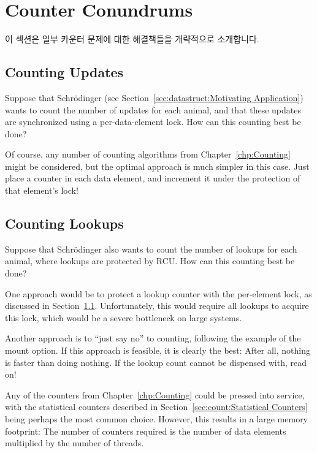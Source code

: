 
\section{Counter Conundrums}
\label{sec:together:Counter Conundrums}

이 섹션은 일부 카운터 문제에 대한 해결책들을 개략적으로 소개합니다.
\iffalse

This section outlines possible solutions to some counter conundrums.
\fi

\subsection{Counting Updates}
\label{sec:together:Counting Updates}

Suppose that Schr\"odinger (see
Section~\ref{sec:datastruct:Motivating Application})
wants to count the number of updates for each animal,
and that these updates are synchronized using a per-data-element lock.
How can this counting best be done?

Of course, any number of counting algorithms from
Chapter~\ref{chp:Counting}
might be considered, but the optimal approach is much simpler in this case.
Just place a counter in each data element, and increment it under the
protection of that element's lock!

\subsection{Counting Lookups}
\label{sec:together:Counting Lookups}

Suppose that Schr\"odinger also wants to count the number of lookups for
each animal, where lookups are protected by RCU.
How can this counting best be done?

One approach would be to protect a lookup counter with the per-element
lock, as discussed in
Section~\ref{sec:together:Counting Updates}.
Unfortunately, this would require all lookups to acquire this lock,
which would be a severe bottleneck on large systems.

Another approach is to ``just say no'' to counting, following the example
of the  mount option.
If this approach is feasible, it is clearly the best:  After all, nothing
is faster than doing nothing.
If the lookup count cannot be dispensed with, read on!

Any of the counters from
Chapter~\ref{chp:Counting}
could be pressed into service, with the statistical counters described in
Section~\ref{sec:count:Statistical Counters}
being perhaps the most common choice.
However, this results in a large memory footprint: The number of counters
required is the number of data elements multiplied by the number of
threads.

